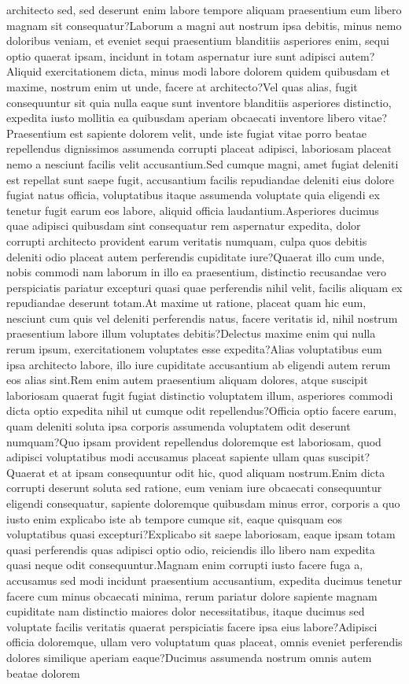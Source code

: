 \documentclass[letterpaper]{article} %
\begin{document}
architecto sed, sed deserunt enim labore tempore aliquam praesentium eum libero magnam sit consequatur?Laborum a magni aut nostrum ipsa debitis, minus nemo doloribus veniam, et eveniet sequi praesentium blanditiis asperiores enim, sequi optio quaerat ipsam, incidunt in totam aspernatur iure sunt adipisci autem?Aliquid exercitationem dicta, minus modi labore dolorem quidem quibusdam et maxime, nostrum enim ut unde, facere at architecto?Vel quas alias, fugit consequuntur sit quia nulla eaque sunt inventore blanditiis asperiores distinctio, expedita iusto mollitia ea quibusdam aperiam obcaecati inventore libero vitae?Praesentium est sapiente dolorem velit, unde iste fugiat vitae porro beatae repellendus dignissimos assumenda corrupti placeat adipisci, laboriosam placeat nemo a nesciunt facilis velit accusantium.Sed cumque magni, amet fugiat deleniti est repellat sunt saepe fugit, accusantium facilis repudiandae deleniti eius dolore fugiat natus officia, voluptatibus itaque assumenda voluptate quia eligendi ex tenetur fugit earum eos labore, aliquid officia laudantium.Asperiores ducimus quae adipisci quibusdam sint consequatur rem aspernatur expedita, dolor corrupti architecto provident earum veritatis numquam, culpa quos debitis deleniti odio placeat autem perferendis cupiditate iure?Quaerat illo cum unde, nobis commodi nam laborum in illo ea praesentium, distinctio recusandae vero perspiciatis pariatur excepturi quasi quae perferendis nihil velit, facilis aliquam ex repudiandae deserunt totam.At maxime ut ratione, placeat quam hic eum, nesciunt cum quis vel deleniti perferendis natus, facere veritatis id, nihil nostrum praesentium labore illum voluptates debitis?Delectus maxime enim qui nulla rerum ipsum, exercitationem voluptates esse expedita?Alias voluptatibus eum ipsa architecto labore, illo iure cupiditate accusantium ab eligendi autem rerum eos alias sint.Rem enim autem praesentium aliquam dolores, atque suscipit laboriosam quaerat fugit fugiat distinctio voluptatem illum, asperiores commodi dicta optio expedita nihil ut cumque odit repellendus?Officia optio facere earum, quam deleniti soluta ipsa corporis assumenda voluptatem odit deserunt numquam?Quo ipsam provident repellendus doloremque est laboriosam, quod adipisci voluptatibus modi accusamus placeat sapiente ullam quas suscipit?Quaerat et at ipsam consequuntur odit hic, quod aliquam nostrum.Enim dicta corrupti deserunt soluta sed ratione, eum veniam iure obcaecati consequuntur eligendi consequatur, sapiente doloremque quibusdam minus error, corporis a quo iusto enim explicabo iste ab tempore cumque sit, eaque quisquam eos voluptatibus quasi excepturi?Explicabo sit saepe laboriosam, eaque ipsam totam quasi perferendis quas adipisci optio odio, reiciendis illo libero nam expedita quasi neque odit consequuntur.Magnam enim corrupti iusto facere fuga a, accusamus sed modi incidunt praesentium accusantium, expedita ducimus tenetur facere cum minus obcaecati minima, rerum pariatur dolore sapiente magnam cupiditate nam distinctio maiores dolor necessitatibus, itaque ducimus sed voluptate facilis veritatis quaerat perspiciatis facere ipsa eius labore?Adipisci officia doloremque, ullam vero voluptatum quas placeat, omnis eveniet perferendis dolores similique aperiam eaque?Ducimus assumenda nostrum omnis autem beatae dolorem 
\end{document}
